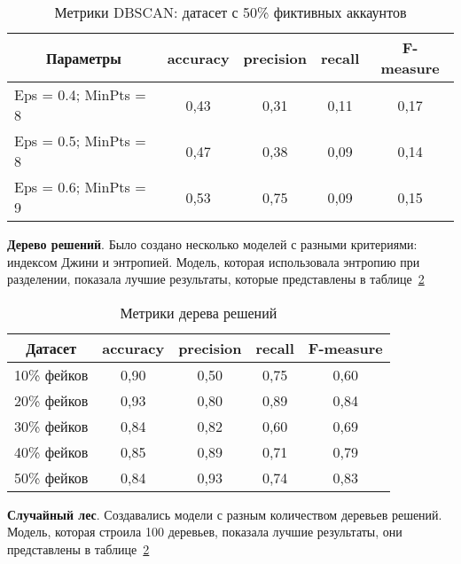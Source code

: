 \begin{table}[H]
    \caption{Метрики DBSCAN: датасет с 50\% фиктивных аккаунтов}
    \vspace{1em}
    \small
    \begin{tabular}{|l|c|c|c|c|}
    \hline
    \multicolumn{1}{|c|}{\textbf{Параметры}} & \textbf{accuracy} & \textbf{precision} & \textbf{recall} & \textbf{F-measure} \\ \hline
    Eps = 0.4; MinPts = 8 & 0,43 & 0,31 & 0,11 & 0,17 \\ \hline
    Eps = 0.5; MinPts = 8 & 0,47 & 0,38 & 0,09 & 0,14 \\ \hline
    Eps = 0.6; MinPts = 9 & 0,53 & 0,75 & 0,09 & 0,15 \\ \hline
    \end{tabular}
    \label{tabular:DBSCAN6}
\end{table}


\textbf{Дерево решений}. Было создано несколько моделей с разными критериями: индексом Джини и энтропией. Модель, которая использовала энтропию при разделении, показала лучшие результаты, которые представлены в таблице~\ref{tabular:tableDecTree}

\vspace{-0.5em}
\begin{table}[H]
    \caption{Метрики дерева решений}
    \vspace{1em}
    \small
    \begin{tabular}{|l|c|c|c|c|}
    \hline
    \multicolumn{1}{|c|}{\textbf{Датасет}} & \textbf{accuracy} & \textbf{precision} & \textbf{recall} & \textbf{F-measure} \\ \hline
    10\% фейков & 0,90 & 0,50 & 0,75 & 0,60 \\ \hline
    20\% фейков & 0,93 & 0,80 & 0,89 & 0,84 \\ \hline
    30\% фейков & 0,84 & 0,82 & 0,60 & 0,69 \\ \hline
    40\% фейков & 0,85 & 0,89 & 0,71 & 0,79 \\ \hline
    50\% фейков & 0,84 & 0,93 & 0,74 & 0,83 \\ \hline
    \end{tabular}
    \label{tabular:tableDecTree}
\end{table}


\textbf{Случайный лес}. Создавались модели с разным количеством деревьев решений. Модель, которая строила 100 деревьев, показала лучшие результаты, они представлены в таблице~\ref{tabular:tableDecTree}

